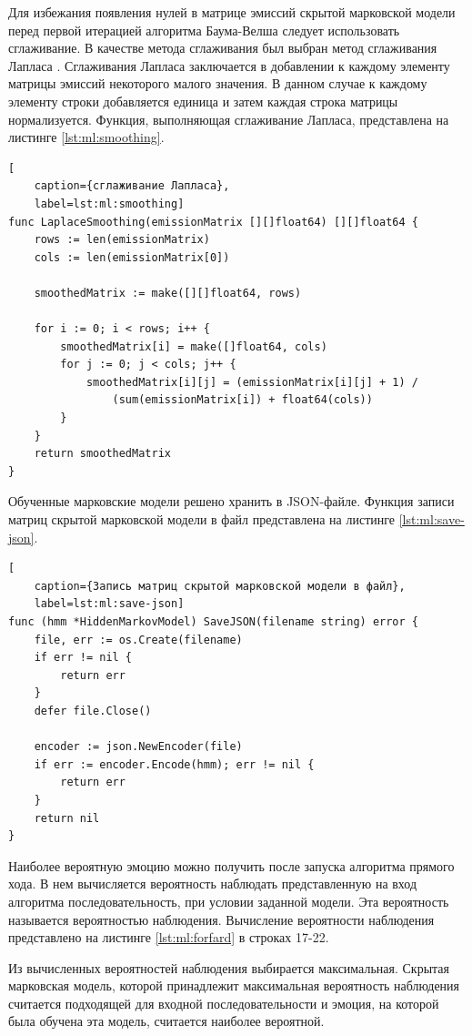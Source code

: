 Для избежания появления нулей в матрице эмиссий скрытой марковской модели перед первой итерацией алгоритма Баума-Велша следует использовать сглаживание. В качестве метода сглаживания был выбран метод сглаживания Лапласа \cite{smooting}.
%
Сглаживания Лапласа заключается в добавлении к каждому элементу матрицы эмиссий некоторого малого значения. В данном случае к каждому элементу строки добавляется единица и затем каждая строка матрицы нормализуется. Функция, выполняющая сглаживание Лапласа, представлена на листинге \ref{lst:ml:smoothing}.
\begin{lstlisting}[
	caption={сглаживание Лапласа},
	label=lst:ml:smoothing]
func LaplaceSmoothing(emissionMatrix [][]float64) [][]float64 {
	rows := len(emissionMatrix)
	cols := len(emissionMatrix[0])
	
	smoothedMatrix := make([][]float64, rows)
	
	for i := 0; i < rows; i++ {
		smoothedMatrix[i] = make([]float64, cols)
		for j := 0; j < cols; j++ {
			smoothedMatrix[i][j] = (emissionMatrix[i][j] + 1) /
				(sum(emissionMatrix[i]) + float64(cols))
		}
	}
	return smoothedMatrix
}
\end{lstlisting}
Обученные марковские модели решено хранить в JSON-файле. Функция записи матриц скрытой марковской модели в файл представлена на листинге \ref{lst:ml:save-json}.
\begin{lstlisting}[
	caption={Запись матриц скрытой марковской модели в файл},
	label=lst:ml:save-json]
func (hmm *HiddenMarkovModel) SaveJSON(filename string) error {
	file, err := os.Create(filename)
	if err != nil {
		return err
	}
	defer file.Close()
	
	encoder := json.NewEncoder(file)
	if err := encoder.Encode(hmm); err != nil {
		return err
	}
	return nil
}
\end{lstlisting}

Наиболее вероятную эмоцию можно получить после запуска алгоритма прямого хода. В нем вычисляется вероятность наблюдать представленную на вход алгоритма последовательность, при условии заданной модели. Эта вероятность называется вероятностью наблюдения. Вычисление вероятности наблюдения представлено на листинге \ref{lst:ml:forfard} в строках 17-22.

Из вычисленных вероятностей наблюдения выбирается максимальная. Скрытая марковская модель, которой принадлежит максимальная вероятность наблюдения считается подходящей для входной последовательности и эмоция, на которой была обучена эта модель, считается наиболее вероятной.

